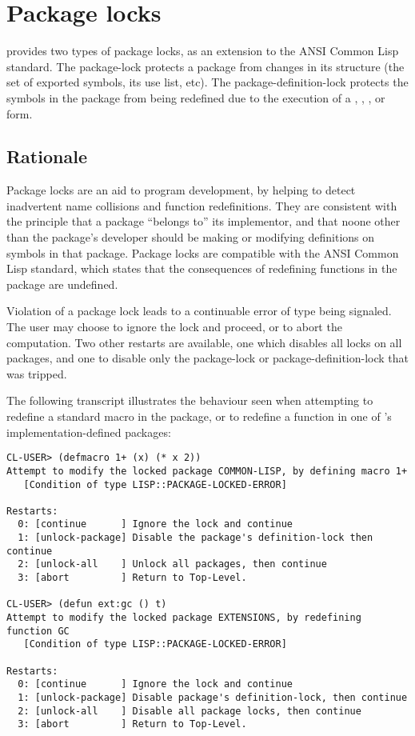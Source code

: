 \section{Package locks}

\cmucl{} provides two types of package locks, as an extension to the
ANSI Common Lisp standard. The package-lock protects a package from
changes in its structure (the set of exported symbols, its use list,
etc). The package-definition-lock protects the symbols in the package
from being redefined due to the execution of a ,
, ,  or 
form.


\subsection{Rationale}

Package locks are an aid to program development, by helping to detect
inadvertent name collisions and function redefinitions. They are
consistent with the principle that a package ``belongs to'' its
implementor, and that noone other than the package's developer should
be making or modifying definitions on symbols in that package. Package
locks are compatible with the ANSI Common Lisp standard, which states
that the consequences of redefining functions in the
 package are undefined.

Violation of a package lock leads to a continuable error of type
 being signaled. The user may choose
to ignore the lock and proceed, or to abort the computation. Two other
restarts are available, one which disables all locks on all packages,
and one to disable only the package-lock or package-definition-lock
that was tripped.

The following transcript illustrates the behaviour seen when
attempting to redefine a standard macro in the 
package, or to redefine a function in one of \cmucl{}'s
implementation-defined packages:

\begin{verbatim}
CL-USER> (defmacro 1+ (x) (* x 2))
Attempt to modify the locked package COMMON-LISP, by defining macro 1+
   [Condition of type LISP::PACKAGE-LOCKED-ERROR]

Restarts:
  0: [continue      ] Ignore the lock and continue
  1: [unlock-package] Disable the package's definition-lock then continue
  2: [unlock-all    ] Unlock all packages, then continue
  3: [abort         ] Return to Top-Level.

CL-USER> (defun ext:gc () t)
Attempt to modify the locked package EXTENSIONS, by redefining function GC
   [Condition of type LISP::PACKAGE-LOCKED-ERROR]

Restarts:
  0: [continue      ] Ignore the lock and continue
  1: [unlock-package] Disable package's definition-lock, then continue
  2: [unlock-all    ] Disable all package locks, then continue
  3: [abort         ] Return to Top-Level.
\end{verbatim}


